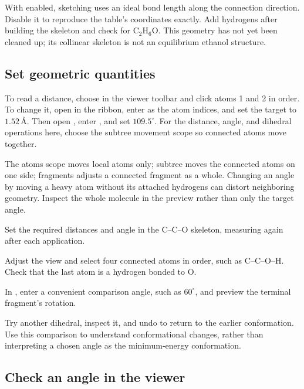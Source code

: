 With  enabled, sketching uses an ideal bond length along the connection direction. Disable it to reproduce the table's coordinates exactly. Add hydrogens after building the skeleton and check for $\mathrm{C_2H_6O}$. This geometry has not yet been cleaned up; its collinear skeleton is not an equilibrium ethanol structure.

\subsection{Set geometric quantities}

To read a distance, choose  in the viewer toolbar and click atoms 1 and 2 in order. To change it, open  in the ribbon, enter  as the atom indices, and set the target to $1.52\,\text{\AA}$. Then open , enter , and set $109.5^\circ$. For the distance, angle, and dihedral operations here, choose the subtree movement scope so connected atoms move together.

The atoms scope moves local atoms only; subtree moves the connected atoms on one side; fragments adjusts a connected fragment as a whole. Changing an angle by moving a heavy atom without its attached hydrogens can distort neighboring geometry. Inspect the whole molecule in the preview rather than only the target angle.

\begin{steps}
  \item Set the required distances and angle in the C--C--O skeleton, measuring again after each application.
  \item Adjust the view and select four connected atoms in order, such as C--C--O--H. Check that the last atom is a hydrogen bonded to O.
  \item In , enter a convenient comparison angle, such as $60^\circ$, and preview the terminal fragment's rotation.
  \item Try another dihedral, inspect it, and undo to return to the earlier conformation. Use this comparison to understand conformational changes, rather than interpreting a chosen angle as the minimum-energy conformation.
\end{steps}

\subsection{Check an angle in the viewer}

